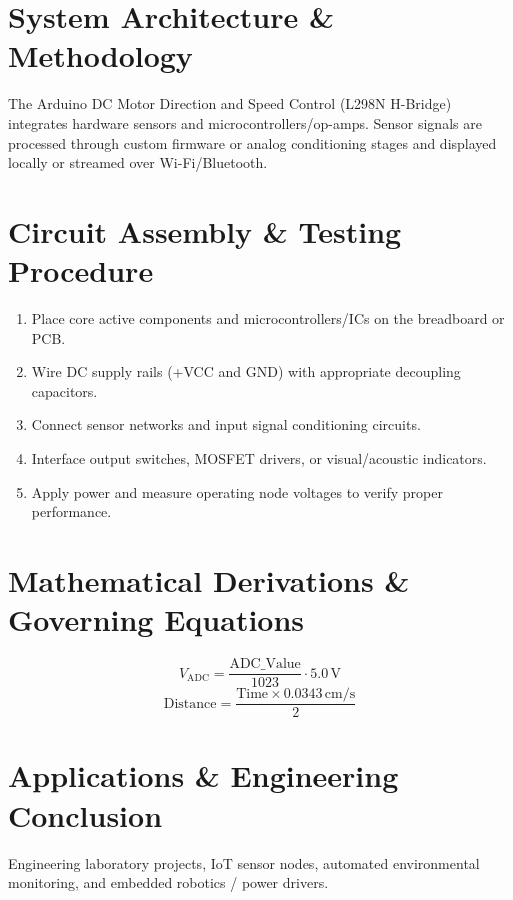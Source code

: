 \documentclass[11pt,a4paper]{article}
\begin{document}
\section{System Architecture \& Methodology}
The Arduino DC Motor Direction and Speed Control (L298N H-Bridge) integrates hardware sensors and microcontrollers/op-amps. Sensor signals are processed through custom firmware or analog conditioning stages and displayed locally or streamed over Wi-Fi/Bluetooth.

\section{Circuit Assembly \& Testing Procedure}
\begin{enumerate}
    \item Place core active components and microcontrollers/ICs on the breadboard or PCB.
    \item Wire DC supply rails (+VCC and GND) with appropriate decoupling capacitors.
    \item Connect sensor networks and input signal conditioning circuits.
    \item Interface output switches, MOSFET drivers, or visual/acoustic indicators.
    \item Apply power and measure operating node voltages to verify proper performance.
\end{enumerate}

\section{Mathematical Derivations \& Governing Equations}
\begin{equation}
V_{\text{ADC}} = \frac{\text{ADC\_Value}}{1023} \cdot 5.0\,\text{V}
\end{equation}
\begin{equation}
\text{Distance} = \frac{\text{Time} \times 0.0343\,\text{cm/s}}{2}
\end{equation}

\section{Applications \& Engineering Conclusion}
Engineering laboratory projects, IoT sensor nodes, automated environmental monitoring, and embedded robotics / power drivers.
\end{document}
